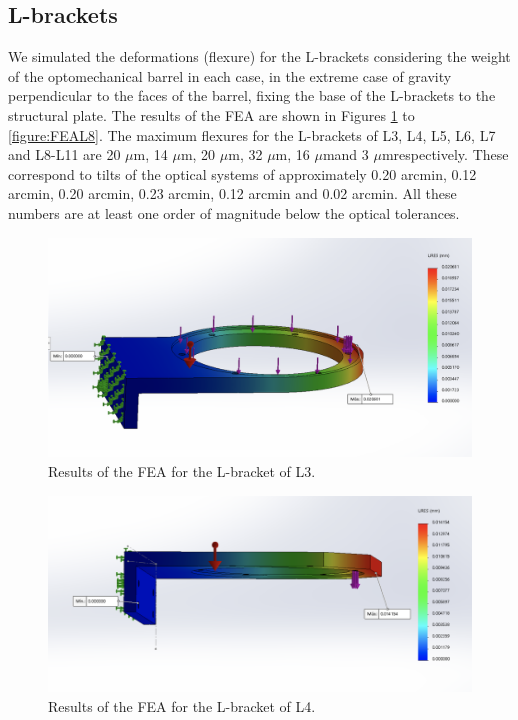 \documentclass{report}
\newcommand{\micron}{\mbox{$\mu$m}}
\begin{document}
\subsection{L-brackets}

We simulated the deformations (flexure) for the L-brackets considering the weight of the optomechanical barrel in each case, in the extreme case of gravity perpendicular to the faces of the barrel, fixing the base of the L-brackets to the structural plate. The results of the FEA are shown in Figures \ref{figure:FEAL3} to \ref{figure:FEAL8}. The maximum flexures for the L-brackets of L3, L4, L5, L6, L7 and L8-L11 are 20 \micron, 14 \micron, 20 \micron, 32 \micron, 16 \micron and 3 \micron  respectively. These correspond to tilts of the optical systems of approximately 0.20 arcmin, 0.12 arcmin, 0.20 arcmin, 0.23 arcmin, 0.12 arcmin and 0.02 arcmin. All these numbers are at least one order of magnitude below the optical tolerances.


\begin{figure}
\centering
\includegraphics[width=0.8\linewidth]{figures/FEAL3.png}
\caption{Results of the FEA for the L-bracket of L3.}
\label{figure:FEAL3}
\end{figure}

\begin{figure}
\centering
\includegraphics[width=0.8\linewidth]{figures/FEAL4.png}
\caption{Results of the FEA for the L-bracket of L4.}
\label{figure:FEAL4}
\end{figure}
\end{document}
